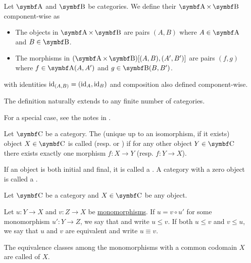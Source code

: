 \begin{definition}\label{def:product_category}
  Let \( \Cat{A} \) and \( \Bold B \) be categories. We define their  \( \Cat{A} \times \Bold B \) component-wise as
  \begin{itemize}
    \item The objects in \( \Cat{A} \times \Bold B \) are pairs \( (A, B) \) where \( A \in \Cat{A} \) and \( B \in \Bold B \).
    \item The morphisms in \( (\Cat{A} \times \Bold B)[(A, B), (A', B')] \) are pairs \( (f, g) \) where \( f \in \Cat{A}(A, A') \) and \( g \in \Bold{B}(B, B') \).
  \end{itemize}
  with identities \( \operatorname{id}_{(A,B)} =(\operatorname{id}_A, \operatorname{id}_B) \) and composition also defined component-wise.

  The definition naturally extends to any finite number of categories.

  For a special case, see the notes in .
\end{definition}

\begin{definition}\label{def:initial_final_objects}
  Let \( \Cat{C} \) be a category. The (unique up to an isomorphism, if it exists) object \( X \in \Cat{C} \) is called  (resp.  or ) if for any other object \( Y \in \Cat{C} \) there exists exactly one morphism \( f: X \to Y \) (resp. \( f: Y \to X \)).

  If an object is both initial and final, it is called a . A category with a zero object is called a .
\end{definition}

\begin{definition}\label{def:categorical_subobject}
  Let \( \Cat{C} \) be a category and \( X \in \Cat{C} \) be any object.

  Let \( u: Y \to X \) and \( v: Z \to X \) be \hyperref[def:morphism_invertibility]{monomorphisms}. If \( u = v \circ u' \) for some monomorphism \( u': Y \to Z \), we say that  and write \( u \leq v \). If both \( u \leq v \) and \( v \leq u \), we say that \( u \) and \( v \) are equivalent and write \( u \equiv v \).

  The equivalence classes among the monomorphisms with a common codomain \( X \) are called  of \( X \).
\end{definition}
